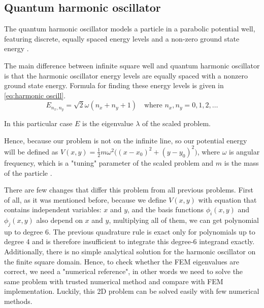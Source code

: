 \documentclass[acmsmall,screen]{MapleTrans}
\begin{document}
\subsection{Quantum harmonic oscillator}
The quantum harmonic oscillator models a particle in a parabolic potential well, featuring discrete, equally spaced energy levels and a non-zero ground state energy \cite{b28}.

The main difference between infinite square well and quantum harmonic oscillator is that the harmonic oscillator energy levels  are equally spaced with a nonzero ground state energy. Formula for finding these energy levels is given in \eqref{eq:harmonic oscill}.
\begin{equation}
    E_{n_x, n_y} = \sqrt{2}\omega(n_x + n_y + 1) \quad \text{where } n_x, n_y = 0, 1, 2, \dots
    \label{eq:harmonic oscill}
\end{equation}

In this particular case $E$ is the eigenvalue $\lambda$ of the scaled problem.

Hence, because our problem is not on the infinite line, so our potential energy will be defined as $V(x, y) = \frac{1}{2}m\omega^2\Big((x - x_0)^2 + (y - y_0)^2\Big)$, where $\omega$ is angular frequency, which is a "tuning" parameter of the scaled problem and $m$ is the mass of the particle \cite{b28}.

There are few changes that differ this problem from all previous problems. First of all, as it was mentioned before, because we define $V(x, y)$ with equation that contains independent variables: $x$ and $y$, and the basis functions $\phi_i(x, y)$ and $\phi_j(x, y)$ also depend on $x$ and $y$, multiplying all of them, we can get polynomial up to degree 6. The previous quadrature rule is exact only for polynomials up to degree 4 and is therefore insufficient to integrate this degree-6 integrand exactly.
Additionally, there is no simple analytical solution for the harmonic oscillator on the finite square domain. Hence, to check whether the FEM eigenvalues are correct, we need a "numerical reference", in other words we need to solve the same problem with trusted numerical method and compare with FEM implementation. Luckily, this 2D problem can be solved easily with few numerical methods.
\end{document}
